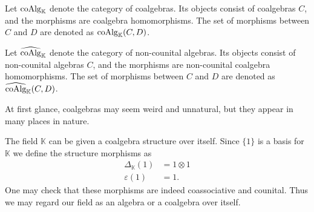 \documentclass[../thesis.tex]{subfiles}
\begin{document}
            \begin{definition}
                Let $\tt{coAlg}_{\mathbb{K}}$ denote the category of coalgebras. Its objects consist of coalgebras $C$, and the morphisms are coalgebra homomorphisms. The set of morphisms between $C$ and $D$ are denoted as $\tt{coAlg}_{\mathbb{K}}(C,D)$.
                
                Let $\widehat{\tt{coAlg}}_{\mathbb{K}}$ denote the category of non-counital algebras. Its objects consist of non-counital algebras $C$, and the morphisms are non-counital coalgebra homomorphisms. The set of morphisms between $C$ and $D$ are denoted as $\widehat{\tt{coAlg}}_{\mathbb{K}}(C,D)$.
            \end{definition}

            At first glance, coalgebras may seem weird and unnatural, but they appear in many places in nature.

            \begin{example}
                The field $\mathbb{K}$ can be given a coalgebra structure over itself. Since $\{1\}$ is a basis for $\mathbb{K}$ we define the structure morphisms as
                \begin{align*}
                    \Delta_{\mathbb{K}}(1) & = 1\otimes 1 \\
                    \varepsilon(1) & = 1.
                \end{align*}
                One may check that these morphisms are indeed coassociative and counital. Thus we may regard our field as an algebra or a coalgebra over itself.
            \end{example}
\end{document}
